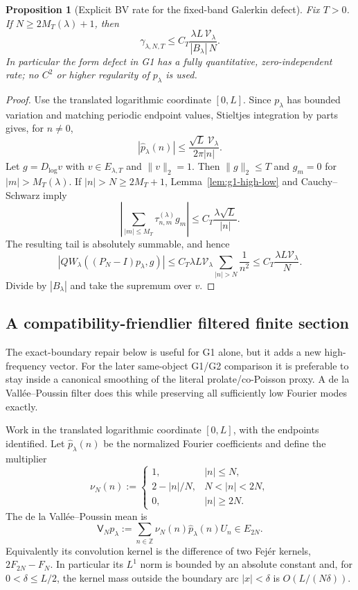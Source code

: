 \documentclass[11pt]{article}
\newtheorem{proposition}[theorem]{Proposition}
\theoremstyle{remark}
\begin{document}
\begin{proposition}[Explicit BV rate for the fixed-band Galerkin defect]\label{prop:g1-bv-rate}
Fix $T>0$.  If $N\ge2M_T(\lambda)+1$, then
\begin{equation}\label{eq:g1-gamma-rate}
 \boxed{
 \gamma_{\lambda,N,T}
 \le C_T\frac{\lambda L\,\mathcal V_\lambda}
 {|B_\lambda|\,N}.}
\end{equation}
In particular the form defect in G1 has a fully quantitative,
zero-independent rate; no $C^2$ or higher regularity of $p_\lambda$ is used.
\end{proposition}
\begin{proof}
Use the translated logarithmic coordinate $[0,L]$.  Since $p_\lambda$ has
bounded variation and matching periodic endpoint values, Stieltjes integration
by parts gives, for $n\ne0$,
\[
 |\widehat p_\lambda(n)|
 \le\frac{\sqrt L\,\mathcal V_\lambda}{2\pi|n|}.
\]
Let $g=D_{\log}v$ with $v\in E_{\lambda,T}$ and $\|v\|_2=1$.  Then
$\|g\|_2\le T$ and $g_m=0$ for $|m|>M_T(\lambda)$.  If $|n|>N\ge2M_T+1$,
Lemma~\ref{lem:g1-high-low} and Cauchy--Schwarz imply
\[
 \left|\sum_{|m|\le M_T}\tau^{(\lambda)}_{n,m}g_m\right|
 \le C_T\frac{\lambda\sqrt L}{|n|}.
\]
The resulting tail is absolutely summable, and hence
\[
 |QW_\lambda((P_N-I)p_\lambda,g)|
 \le C_T\lambda L\mathcal V_\lambda
       \sum_{|n|>N}\frac1{n^2}
 \le C_T\frac{\lambda L\mathcal V_\lambda}{N}.
\]
Divide by $|B_\lambda|$ and take the supremum over $v$.
\end{proof}

\subsection*{A compatibility-friendlier filtered finite section}
The exact-boundary repair below is useful for G1 alone, but it adds a new
high-frequency vector.  For the later same-object G1/G2 comparison it is
preferable to stay inside a canonical smoothing of the literal
prolate/co-Poisson proxy.  A de la Vall\'ee--Poussin filter does this while
preserving all sufficiently low Fourier modes exactly.

Work in the translated logarithmic coordinate $[0,L]$, with the endpoints
identified.  Let $\widehat p_\lambda(n)$ be the normalized Fourier
coefficients and define the multiplier
\begin{equation}\label{eq:g1-vp-multiplier}
 \nu_N(n):=
 \begin{cases}
  1,& |n|\le N,\\
  2-|n|/N,&N<|n|<2N,\\
  0,&|n|\ge2N.
 \end{cases}
\end{equation}
The de la Vall\'ee--Poussin mean is
\begin{equation}\label{eq:g1-vp-mean}
 \mathsf V_Np_\lambda
 :=\sum_{n\in\mathbb Z}\nu_N(n)\widehat p_\lambda(n)U_n\in E_{2N}.
\end{equation}
Equivalently its convolution kernel is the difference of two Fej\'er kernels,
$2F_{2N}-F_N$.  In particular its $L^1$ norm is bounded by an absolute
constant and, for $0<\delta\le L/2$, the kernel mass outside the boundary arc
$|x|<\delta$ is $O(L/(N\delta))$.
\end{document}

